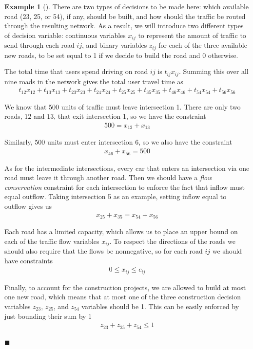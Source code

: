 \documentclass[11pt]{article}
\theoremstyle{definition} %
\newtheorem{ex}{Example}[section] %
\newenvironment{example}[1][]{\begin{ex}[#1]}{\hfill$\blacksquare$\end{ex}} %
\begin{document}
\begin{example}
	There are two types of decisions to be made here: which available road (23, 25, or 54), if any, should be built, and how should the traffic be routed through the resulting network. As a result, we will introduce two different types of decision variable: continuous variables $x_{ij}$ to represent the amount of traffic to send through each road $ij$, and binary variables $z_{ij}$ for each of the three available new roads, to be set equal to 1 if we decide to build the road and 0 otherwise.
	
	The total time that users spend driving on road $ij$ is $t_{ij} x_{ij}$. Summing this over all nine roads in the network gives the total user travel time as
	\begin{align*}
		t_{12} x_{12} + t_{13} x_{13} + t_{23} x_{23} + t_{24} x_{24} + t_{25} x_{25} + t_{35} x_{35} + t_{46} x_{46} + t_{54} x_{54} + t_{56} x_{56}
	\end{align*}
	
	We know that 500 units of traffic must leave intersection 1. There are only two roads, $12$ and $13$, that exit intersection 1, so we have the constraint
	\begin{align*}
		500 = x_{12} + x_{13}
	\end{align*}
	
	Similarly, 500 units must enter intersection 6, so we also have the constraint
	\begin{align*}
		x_{46} + x_{56} = 500
	\end{align*}
	
	As for the intermediate intersections, every car that enters an intersection via one road must leave it through another road. Then we should have a \textit{flow conservation} constraint for each intersection to enforce the fact that inflow must equal outflow. Taking intersection 5 as an example, setting inflow equal to outflow gives us
	\begin{align*}
		x_{25} + x_{35} = x_{54} + x_{56}
	\end{align*}
	
	Each road has a limited capacity, which allows us to place an upper bound on each of the traffic flow variables $x_{ij}$. To respect the directions of the roads we should also require that the flows be nonnegative, so for each road $ij$ we should have constraints
	\begin{align*}
		0 \le x_{ij} \le c_{ij}
	\end{align*}
	
	Finally, to account for the construction projects, we are allowed to build at most one new road, which means that at most one of the three construction decision variables $z_{23}$, $z_{25}$, and $z_{54}$ variables should be 1. This can be easily enforced by just bounding their sum by 1
	\begin{align*}
		z_{23} + z_{25} + z_{54} \le 1
	\end{align*}
	

\end{example}
\end{document}
